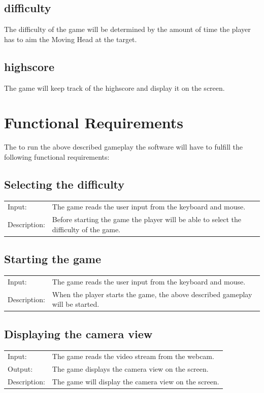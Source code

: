 \documentclass[a4paper]{scrreprt}
\begin{document}
\subsection{difficulty}
The difficulty of the game will be determined by the amount of time the player has to aim the Moving Head at the target.
\subsection{highscore}
The game will keep track of the highscore and display it on the screen.

\section{Functional Requirements}
The to run the above described gameplay the software will have to fulfill the following functional requirements:

\subsection{Selecting the difficulty}
\begin{longtable}{ l p{12cm}}
	Input: & The game reads the user input from the keyboard and mouse.\\
	Description: & Before starting the game the player will be able to select the difficulty of the game.\\
\end{longtable}

\subsection{Starting the game}
\begin{longtable}{ l p{12cm}}
	Input: & The game reads the user input from the keyboard and mouse.\\
	Description: & When the player starts the game, the above described gameplay will be started.\\
\end{longtable}

\subsection{Displaying the camera view}
\begin{longtable}{ l p{12cm}}
	Input: & The game reads the video stream from the webcam.\\
	Output: & The game displays the camera view on the screen.\\
	Description: & The game will display the camera view on the screen.\\
\end{longtable}
\end{document}
